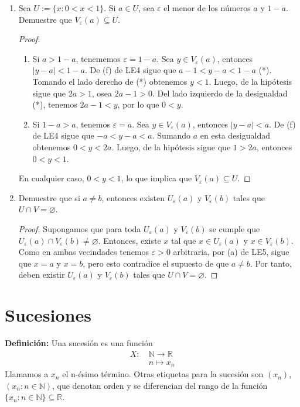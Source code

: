 \documentclass[11pt]{article}
\newcommand{\N}{\mathbb{N}}
\newcommand{\R}{\mathbb{R}}
\let\epsilon\varepsilon
\let\emptyset\varnothing
\begin{document}
\begin{enumerate}[label=\alph*)]
    \item Sea $U:=\{x: 0<x<1\}$. Si $a\in U$, sea $\varepsilon$ el menor de los números $a$ y $1-a$. Demuestre que $V_\varepsilon(a) \subseteq U$.
    \vspace{-1em}\begin{proof} \leavevmode
        \begin{enumerate}[label=\roman*)]
            \item Si $a>1-a$, tenememos $\varepsilon=1-a$. Sea $y\in V_\varepsilon(a)$, entonces $|y-a|<1-a$. De (f) de LE4 sigue que $a-1<y-a<1-a$ (*). Tomando el lado derecho de (*) obtenemos $y<1$. Luego, de la hipótesis sigue que $2a>1$, osea $2a-1>0$. Del lado izquierdo de la desigualdad (*), tenemos $2a-1<y$, por lo que $0<y$.
            \item Si $1-a>a$, tenemos $\varepsilon=a$. Sea $y\in V_\varepsilon(a)$, entonces $|y-a|<a$. De (f) de LE4 sigue que $-a<y-a<a$. Sumando $a$ en esta desigualdad obtenemos $0<y<2a$. Luego, de la hipótesis sigue que $1>2a$, entonces $0<y<1$.\end{enumerate}
            En cualquier caso, $0<y<1$, lo que implica que $V_\varepsilon(a) \subseteq U$.    
    \end{proof} \vspace{-1em}

    \item Demuestre que si $a\neq b$, entonces existen $U_\varepsilon(a)$ y $V_\varepsilon(b)$ tales que $U\cap V =\emptyset$.
    \vspace{-1em}\begin{proof} 
        Supongamos que para toda $U_\varepsilon(a)$ y $V_\varepsilon(b)$ se cumple que $U_\varepsilon(a) \cap V_\varepsilon(b) \neq \emptyset$. Entonces, existe $x$ tal que $x\in U_\varepsilon(a)$ y $x\in V_\varepsilon(b)$. Como en ambas vecindades tenemos $\epsilon>0$ arbitraria, por (a) de LE5, sigue que $x=a$ y $x=b$, pero esto contradice el supuesto de que $a\neq b$. Por tanto, deben existir $U_\varepsilon(a)$ y $V_\varepsilon(b)$ tales que $U\cap V =\emptyset$.    
    \end{proof} \vspace{-1em}
\end{enumerate}

\section*{Sucesiones}

\textbf{Definición:} Una sucesión es una función %
\begin{align*}
    X: \ & \N \to \R \\
    \ &  n \mapsto x_n 
\end{align*}
%
Llamamos a $x_n$ el n-ésimo término. Otras etiquetas para la sucesión son $(x_n)$, $(x_n:n\in \N)$, que denotan orden y se diferencian del rango de la función $\{x_n:n\in \N\}\subseteq \R$.
\end{document}
